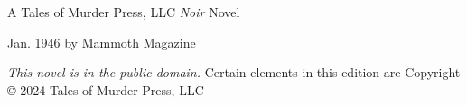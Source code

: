 \documentclass{novel}
\begin{document}
\frontmatter
\thispagestyle{empty}
\begin{parascale}[2]
\vspace*{3\nbs}
\centering{}\par

\end{parascale}
\clearpage
\thispagestyle{empty}
\null %
\clearpage
\thispagestyle{empty}
\begin{parascale}[4]
\centering{}\par

\end{parascale}
\vspace*{2\nbs}

\begin{parascale}[1]
\vspace*{3\nbs}
\par
\end{parascale}
\vfill
\begin{parascale}[1]

A Tales of Murder Press, LLC \textit{Noir} Novel\par
\end{parascale}
\clearpage
\thispagestyle{empty}
\null\vfill
{} Jan. 1946 by Mammoth Magazine\par
\null\null
\allsmcp{}\par
\null\null
\vfill
\begin{adjustwidth}{3em}{3em}
\textit{This novel is in the public domain.} Certain \mbox{elements} in this edition are Copyright © 2024 Tales of Murder Press, LLC
\end{adjustwidth}
\clearpage
\thispagestyle{empty}
\clearpage %
\thispagestyle{empty}
\end{document}
